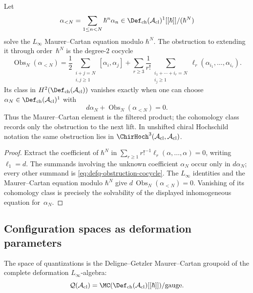 \begin{lemma}
\label{lem:defq-shifted-obstruction-cocycle}
\ClaimStatusProvedHere
Let
\[
\alpha_{<N}=\sum_{1\leq n<N}\hbar^n\alpha_n
\in
\Def_{\mathrm{ch}}(\mathcal A_{\mathrm{cl}})^1[[\hbar]]/(\hbar^N)
\]
solve the \(L_\infty\) Maurer--Cartan equation modulo \(\hbar^N\).
The obstruction to extending it through order~\(\hbar^N\) is the
degree-\(2\) cocycle
\begin{equation}\label{eq:defq-obstruction-cocycle}
\operatorname{Obs}_N(\alpha_{<N})
=
\frac12\sum_{\substack{i+j=N\\ i,j\geq1}}
[\alpha_i,\alpha_j]
+
\sum_{r\geq3}\frac1{r!}
\sum_{\substack{i_1+\cdots+i_r=N\\ i_j\geq1}}
\ell_r(\alpha_{i_1},\ldots,\alpha_{i_r}).
\end{equation}
Its class in \(H^2(\Def_{\mathrm{ch}}(\mathcal A_{\mathrm{cl}}))\)
vanishes exactly when one can choose
\(\alpha_N\in\Def_{\mathrm{ch}}(\mathcal A_{\mathrm{cl}})^1\) with
\[
d\alpha_N+\operatorname{Obs}_N(\alpha_{<N})=0.
\]
Thus the Maurer--Cartan element is the filtered product; the
cohomology class records only the obstruction to the next lift.
In unshifted chiral Hochschild notation the same obstruction lies in
\(\ChirHoch^3(\mathcal A_{\mathrm{cl}},\mathcal A_{\mathrm{cl}})\).
\end{lemma}

\begin{proof}
Extract the coefficient of \(\hbar^N\) in
\(\sum_{r\geq1}r!^{-1}\ell_r(\alpha,\ldots,\alpha)=0\), writing
\(\ell_1=d\). The summands involving the unknown coefficient
\(\alpha_N\) occur only in \(d\alpha_N\); every other summand is
\eqref{eq:defq-obstruction-cocycle}. The \(L_\infty\) identities and
the Maurer--Cartan equation modulo \(\hbar^N\) give
\(d\,\operatorname{Obs}_N(\alpha_{<N})=0\). Vanishing of its cohomology
class is precisely the solvability of the displayed inhomogeneous
equation for~\(\alpha_N\).
\end{proof}

\subsection{Configuration spaces as deformation parameters}

The space of quantizations is the Deligne--Getzler Maurer--Cartan
groupoid of the complete deformation \(L_\infty\)-algebra:
\[\mathcal{Q}(\mathcal{A}_{\text{cl}}) =
\MC(\Def_{\mathrm{ch}}(\mathcal{A}_{\text{cl}})[[\hbar]])/\text{gauge}.\]


